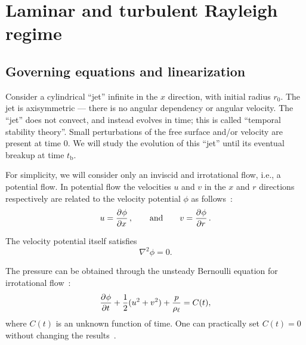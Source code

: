 \chapter{Laminar and turbulent Rayleigh regime}


\section{Governing equations and linearization}

Consider a cylindrical ``jet'' infinite in the $x$ direction, with initial radius $r_0$. The jet is axisymmetric --- there is no angular dependency or angular velocity. The ``jet'' does not convect, and instead evolves in time; this is called ``temporal stability theory''. Small perturbations of the free surface and/or velocity are present at time $0$. We will study the evolution of this ``jet'' until its eventual breakup at time $t_\text{b}$.

For simplicity, we will consider only an inviscid and irrotational flow, i.e., a potential flow. In potential flow the velocities $u$ and $v$ in the $x$ and $r$ directions respectively are related to the velocity potential $\phi$ as follows~\citep[p.~283]{panton_incompressible_2013}:
\begin{equation}
   u = \dpd{\phi}{x}, \qquad \text{and} \qquad v = \dpd{\phi}{r}.
\end{equation}

The velocity potential itself satisfies~\citep[p.~284]{panton_incompressible_2013}
\begin{equation}
   \nabla^2 \phi = 0. \label{eqn:Laplace equation}
\end{equation}

The pressure can be obtained through the unsteady Bernoulli equation for irrotational flow~\citep[p.~284]{panton_incompressible_2013}:
\begin{equation}
   \dpd{\phi}{t} + \frac{1}{2} (u^2 + v^2) + \frac{p}{\rhol} = C(t), \label{eqn:unsteady Bernoulli}
\end{equation}
where $C(t)$ is an unknown function of time. One can practically set $C(t) = 0$ without changing the results~\citep[p.~503]{panton_incompressible_2013}.

